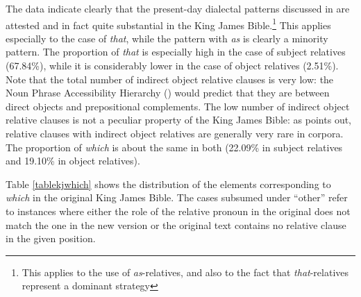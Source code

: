 The data indicate clearly that the present-day dialectal patterns discussed in  are attested and in fact quite substantial in the King James Bible.\footnote{This applies to the use of \textit{as}-relatives, and also to the fact that \textit{that}-relatives represent a dominant strategy} This applies especially to the case of \textit{that}, while the pattern with \textit{as} is clearly a minority pattern. The proportion of \textit{that} is especially high in the case of subject relatives (67.84\%), while it is considerably lower in the case of object relatives (2.51\%). Note that the total number of indirect object relative clauses is very low: the Noun Phrase Accessibility Hierarchy (\citealt{keenancomrie1977}) would predict that they are between direct objects and prepositional complements. The low number of indirect object relative clauses is not a peculiar property of the King James Bible: as \citet{fleischer2004wien} points out, relative clauses with indirect object relatives are generally very rare in corpora. The proportion of \textit{which} is about the same in both (22.09\% in subject relatives and 19.10\% in object relatives).

Table \ref{tablekjwhich} shows the distribution of the elements corresponding to \textit{which} in the original King James Bible. The cases subsumed under ``other'' refer to instances where either the role of the relative pronoun in the original does not match the one in the new version or the original text contains no relative clause in the given position.

